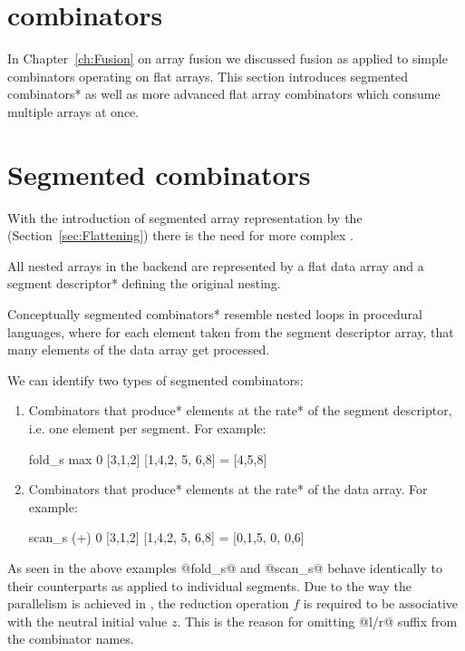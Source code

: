 \documentclass[preamble.tex]{subfiles}
\begin{document}
\clearpage

\section{\DPH combinators}
\label{sec:DPH-Combinators}

In Chapter~\ref{ch:Fusion} on array fusion we discussed fusion as applied to simple combinators operating on flat arrays. This section introduces \*segmented combinators* as well as more advanced flat array combinators which consume multiple arrays at once.


\section{Segmented combinators}
\label{sec:DPH-segmented-combinators}

With the introduction of segmented array representation by the  (Section~\ref{sec:Flattening}) there is the need for more complex .\isegcomb

All nested arrays in the \DPH backend are represented by a flat data array and a \*segment descriptor* defining the original nesting.

Conceptually \*segmented combinators* resemble nested loops in procedural languages, where for each element taken from the segment descriptor array, that many elements of the data array get processed.

We can identify two types of segmented combinators:

\begin{enumerate}
\item Combinators that \*produce* elements at the \*rate* of the segment descriptor, i.e. one element per segment. For example:

\begin{hscode}
fold_s max 0 [3,1,2] [1,4,2, 5, 6,8] = [4,5,8]
\end{hscode}

\item Combinators that \*produce* elements at the \*rate* of the data array. For example:

\begin{hscode}
scan_s (+) 0 [3,1,2] [1,4,2, 5, 6,8] = [0,1,5, 0, 0,6]
\end{hscode}
\end{enumerate}

As seen in the above examples @fold_s@ and @scan_s@ behave identically to their  counterparts as applied to individual segments. Due to the way the parallelism is achieved in \DPH, the reduction operation $f$ is required to be associative with the neutral initial value $z$. This is the reason for omitting @l/r@ suffix from the combinator names.
\end{document}
